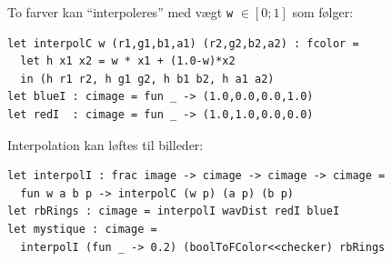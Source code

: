 \documentclass[rgb]{beamer}
\begin{document}
\begin{frame}[fragile]
\begin{footnotesize}

  \sp

  To farver kan ``interpoleres'' med vægt \lstinline{w} $\in [0;1]$ som følger:

  \sp
\begin{lstlisting}[numbers=none,frame=none,mathescape]
let interpolC w (r1,g1,b1,a1) (r2,g2,b2,a2) : fcolor =
  let h x1 x2 = w * x1 + (1.0-w)*x2
  in (h r1 r2, h g1 g2, h b1 b2, h a1 a2)
let blueI : cimage = fun _ -> (1.0,0.0,0.0,1.0)
let redI  : cimage = fun _ -> (1.0,1.0,0.0,0.0)
\end{lstlisting}

\sp
Interpolation kan løftes til billeder:

\begin{lstlisting}[numbers=none,frame=none,mathescape]
let interpolI : frac image -> cimage -> cimage -> cimage =
  fun w a b p -> interpolC (w p) (a p) (b p)
let rbRings : cimage = interpolI wavDist redI blueI
let mystique : cimage =
  interpolI (fun _ -> 0.2) (boolToFColor<<checker) rbRings
\end{lstlisting}

\mbox{ }\hfill
{}\hfill
{}
\hfill \mbox{ }

\end{footnotesize}
\end{frame}
\end{document}
